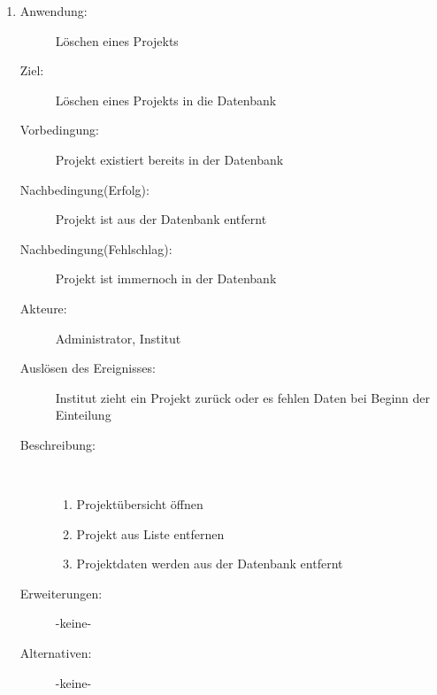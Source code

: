 \documentclass[parskip=full]{scrartcl}
\newcommand{\swtLabel}[1]{\textbf{\textbackslash #1\arabic*0\textbackslash}}
\begin{document}
\begin{enumerate} [label=\swtLabel{A}]
  
  \item
  \begin{description}
  \item[Anwendung:] Löschen eines Projekts
  \item[Ziel:] Löschen eines Projekts in die Datenbank
  	\item[Vorbedingung:] Projekt existiert bereits in der Datenbank
  	\item[Nachbedingung(Erfolg):] Projekt ist aus der Datenbank entfernt
  	\item[Nachbedingung(Fehlschlag):] Projekt ist immernoch in der Datenbank
  	\item[Akteure:] Administrator, Institut
  	\item[Auslösen des Ereignisses:] Institut zieht ein Projekt zurück oder es
  	fehlen Daten bei Beginn der Einteilung
  	\item[Beschreibung:]~
  	\begin{enumerate} 
  	  \item Projektübersicht öffnen
  	  \item Projekt aus Liste entfernen
  	  \item Projektdaten werden aus der Datenbank entfernt
  	\end{enumerate}
  	\item[Erweiterungen:] -keine-
  	\item[Alternativen:] -keine-
  \end{description}
   

\end{enumerate}
\end{document}
